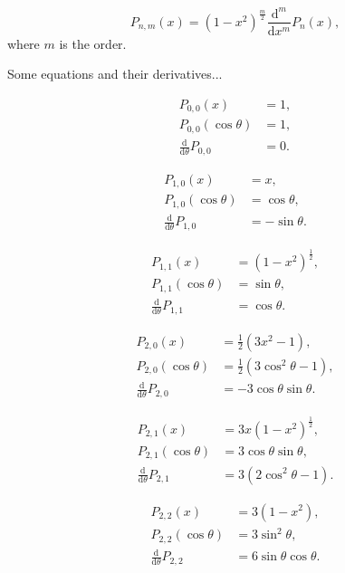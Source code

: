 \documentclass[]{article}
\begin{document}
	\begin{equation}
		P_{n,m}(x) = (1 - x^2)^\frac{m}{2} \frac{\text{d}^m}{\text{d}x^m} P_n(x) \label{EqFerrers},
	\end{equation}
	where $m$ is the order.


	Some equations and their derivatives...
	
	\begin{align}
		P_{0,0} (x) &= 1, \\
		P_{0,0} (\cos{\theta}) &= 1, \\
		\frac{\text{d}}{\text{d} \theta} P_{0,0} &= 0.
	\end{align}

	\begin{align}
		P_{1,0} (x) &= x, \\
		P_{1,0} (\cos{\theta}) &= \cos{\theta}, \\
		\frac{\text{d}}{\text{d} \theta} P_{1,0} &= -\sin{\theta}.
	\end{align}
	
	\begin{align}
		P_{1,1} (x) &= (1 - x^2)^\frac{1}{2}, \\
		P_{1,1} (\cos{\theta}) &= \sin{\theta}, \\
		\frac{\text{d}}{\text{d} \theta} P_{1,1} &= \cos{\theta}.
	\end{align}

	
	\begin{align}
		P_{2,0} (x) &= \frac{1}{2} (3 x^2 - 1), \\
		P_{2,0} (\cos{\theta}) &= \frac{1}{2}(3\cos^2{\theta} - 1), \\
		\frac{\text{d}}{\text{d} \theta} P_{2,0} &= -3\cos{\theta}\sin{\theta}.
	\end{align}

	\begin{align}
		P_{2,1} (x) &= 3x(1-x^2)^\frac{1}{2}, \\
		P_{2,1} (\cos{\theta}) &= 3\cos{\theta}\sin{\theta}, \\
		\frac{\text{d}}{\text{d} \theta} P_{2,1} &= 3(2\cos^2{\theta}-1).
	\end{align}

	\begin{align}
		P_{2,2} (x) &= 3(1-x^2), \\
		P_{2,2} (\cos{\theta}) &= 3\sin^2{\theta}, \\
		\frac{\text{d}}{\text{d} \theta} P_{2,2} &= 6\sin{\theta}\cos{\theta}.
	\end{align}
\end{document}
